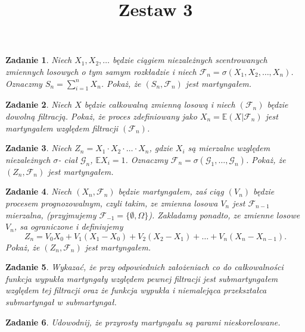 \documentclass{mwart}
\title{Zestaw 3}
\newtheorem{zd}{Zadanie}
\begin{document}

\maketitle


\begin{zd}
Niech $X_1, X_2, \dots$ będzie ciągiem niezależnych scentrowanych zmiennych losowych o tym samym rozkładzie i niech $\mathcal{F}_n = \sigma(X_1, X_2, \dots, X_n)$. Oznaczmy $S_n = \sum_{i=1}^nX_n$. Pokaż, że $(S_n, \mathcal{F}_n)$ jest martyngałem.
\end{zd}


\begin{zd}
Niech $X$ będzie całkowalną zmienną losową i niech $(\mathcal{F}_n)$ będzie dowolną filtracją. Pokaż, że proces zdefiniowany jako $X_n = \mathbb{E}(X|\mathcal{F}_n)$ jest martyngałem względem filtracji $(\mathcal{F}_n)$.
\end{zd}

\begin{zd}
Niech $Z_n = X_1\cdot X_2 \cdot \dots \cdot X_n$, gdzie $X_i$ są mierzalne względem niezależnych $\sigma$- ciał $\mathcal{G}_n$, $\mathbb{E}X_i = 1$. Oznaczmy $\mathcal{F}_n = \sigma(\mathcal{G}_1, \dots, \mathcal{G}_n)$. Pokaż, że $(Z_n, \mathcal{F}_n)$ jest martyngałem.
\end{zd}

\begin{zd}
Niech $(X_n, \mathcal{F}_n)$ będzie martyngałem, zaś ciąg $(V_n)$ będzie procesem prognozowalnym, czyli takim, ze zmienna losowa $V_n$ jest $\mathcal{F}_{n-1}$ mierzalna, (przyjmujemy $\mathcal{F}_{-1} = \{\emptyset, \Omega\}$). Zakladamy ponadto, ze zmienne losowe $V_n$, sa ograniczone i definiujemy
\begin{displaymath}
Z_n = V_0X_0 + V_1(X_1-X_0) + V_2(X_2-X_1) + \dots + V_n(X_n - X_{n-1}).
\end{displaymath}
Pokaż, że $(Z_n, \mathcal{F}_n)$ jest martyngałem.
\end{zd}

\begin{zd}
Wykazać, że przy odpowiednich założeniach co do całkowalności funkcja wypukła martyngały względem pewnej filtracji jest submartyngałem względem tej filtracji oraz że funkcja wypukła i niemalejąca przekształca submartyngał w submartyngał.
\end{zd}

\begin{zd}
Udowodnij, że przyrosty martyngału są parami nieskorelowane.
\end{zd}
\end{document}
